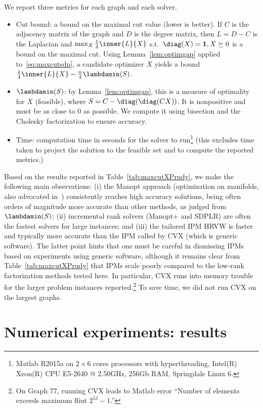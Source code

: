 \documentclass{article}
\newcommand{\1}{\mathbf{1}}
\begin{document}
We report three metrics for each graph and each solver.
\begin{itemize}
	\item[] Cut bound: a bound on the maximal cut value (lower is better). If $C$ is the adjacency matrix of the graph and $D$ is the degree matrix, then $L = D-C$ is the Laplacian and $\max_{X} \frac{1}{4}\inner{L}{X}$ s.t.\ $\diag(X) = \1, X \succeq 0$ is a bound on the maximal cut. Using Lemma~\ref{lem:optimgap} applied to~\eqref{eq:maxcutsdp}, a candidate optimizer $X$ yields a bound $\frac{1}{4}\inner{L}{X} - \frac{n}{4}\lambdamin(S)$.
	\item[] $\lambdamin(S)$: by Lemma~\ref{lem:optimgap}, this is a measure of optimality for $X$ (feasible), where $S = C - \diag(\diag(CX))$. It is nonpositive and must be as close to 0 as possible. We compute it using bisection and the Cholesky factorization to ensure accuracy.
	\item[] Time: computation time in seconds for the solver to run\footnote{Matlab R2015a on $2 \times 6$ cores processors with hyperthreading, Intel(R) Xeon(R) CPU E5-2640 @ 2.50GHz, 256Gb RAM, Springdale Linux 6.} (this excludes time taken to project the solution to the feasible set and to compute the reported metrics.)
\end{itemize}

Based on the results reported in Table~\ref{tab:maxcutXPrudy}, we make the following main observations: (i) the Manopt approach (optimization on manifolds, also advocated in~\citep{journee2010low}) consistently reaches high accuracy solutions, being often orders of magnitude more accurate than other methods, as judged from $\lambdamin(S)$; (ii) incremental rank solvers (Manopt+ and SDPLR) are often the fastest solvers for large instances; and (iii) the tailored IPM HRVW is faster and typically more accurate than the IPM called by CVX (which is generic software). The latter point hints that one must be careful in dismissing IPMs based on experiments using generic software, although it remains clear from Table~\ref{tab:maxcutXPrudy} that IPMs scale poorly compared to the low-rank factorization methods tested here. In particular, CVX runs into memory trouble for the larger problem instances reported.\footnote{On Graph 77, running CVX leads to Matlab error ``Number of elements exceeds maximum flint $2^{53}-1$.''} To save time, we did not run CVX on the largest graphs.


\section{Numerical experiments: results}
\end{document}
